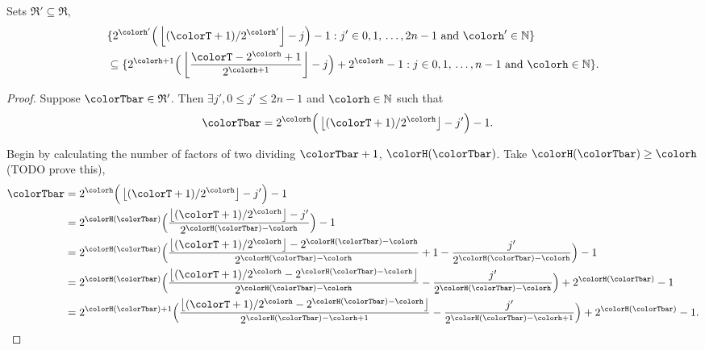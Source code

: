 \begin{sublemma}
\label{thm:tilted-subsetr}
Sets $\mathfrak{R}' \subseteq \mathfrak{R}$,
\begin{align*}
&\{
  2^{\colorh'}\Big(\left\lfloor (\colorT + 1) / 2^{\colorh'} \right\rfloor - j\Big) - 1
  :
  j' \in 0,1,\,\ldots,2n-1
  \text{ and }
  \colorh' \in \mathbb{N}
\}\\
&\subseteq
\{
  2^{\colorh + 1}\Big( \left\lfloor\frac{\colorT - 2^{\colorh} + 1}{2^{\colorh + 1}} \right\rfloor - j\Big) + 2^{\colorh} - 1
  :
  j \in 0,1,\,\ldots,n-1
  \text{ and }
  \colorh \in \mathbb{N}
\}.
\end{align*}

\end{sublemma}
\begin{proof}
Suppose $\colorTbar \in \mathfrak{R}'$.
Then $\exists j',  0 \leq j' \leq 2n - 1$ and $\colorh \in \mathbb{N}$ such that
\begin{align*}
\colorTbar
&= 2^{\colorh}\Big(\left\lfloor (\colorT + 1) / 2^{\colorh} \right\rfloor - j'\Big) - 1.
\end{align*}

Begin by calculating the number of factors of two dividing $\colorTbar + 1$, $\colorH(\colorTbar)$.
Take $\colorH(\colorTbar) \geq \colorh$ (TODO prove this),
\begin{align*}
\colorTbar
&= 2^{\colorh}\Big(\left\lfloor (\colorT + 1) / 2^{\colorh} \right\rfloor - j'\Big) - 1\\
&= 2^{\colorH(\colorTbar)} \Big(
\frac{\left\lfloor (\colorT + 1) / 2^{\colorh} \right\rfloor - j'}{2^{\colorH(\colorTbar) - \colorh}}
\Big)
- 1\\
&= 2^{\colorH(\colorTbar)} \Big(
\frac{\left\lfloor (\colorT + 1) / 2^{\colorh} \right\rfloor - 2^{\colorH(\colorTbar) - \colorh}}{2^{\colorH(\colorTbar) - \colorh}}
+ 1
- \frac{j'}{2^{\colorH(\colorTbar) - \colorh}}
\Big)
- 1\\
&= 2^{\colorH(\colorTbar)} \Big(
\frac{\left\lfloor (\colorT + 1) / 2^{\colorh} - 2^{\colorH(\colorTbar) - \colorh} \right\rfloor}{2^{\colorH(\colorTbar) - \colorh}}
- \frac{j'}{2^{\colorH(\colorTbar) - \colorh}}
\Big)
+ 2^{\colorH(\colorTbar)}
- 1\\
&= 2^{\colorH(\colorTbar) + 1} \Big(
\frac{\left\lfloor (\colorT + 1)/ 2^{\colorh} - 2^{\colorH(\colorTbar) - \colorh} \right\rfloor}{2^{\colorH(\colorTbar) - \colorh + 1}}
- \frac{j'}{2^{\colorH(\colorTbar) - \colorh + 1}}
\Big)
+ 2^{\colorH(\colorTbar)}
- 1.
\end{align*}


\end{proof}
